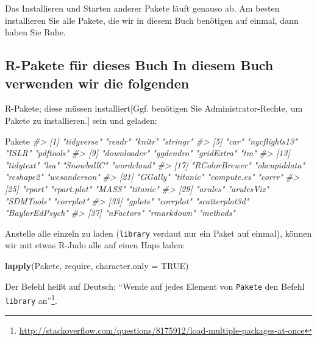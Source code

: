 \documentclass[12pt,]{book}
\newenvironment{Shaded}{\begin{snugshade}}{\end{snugshade}}
\newcommand{\KeywordTok}[1]{\textcolor[rgb]{0.13,0.29,0.53}{\textbf{{#1}}}}
\newcommand{\DataTypeTok}[1]{\textcolor[rgb]{0.13,0.29,0.53}{{#1}}}
\newcommand{\CommentTok}[1]{\textcolor[rgb]{0.56,0.35,0.01}{\textit{{#1}}}}
\newcommand{\OtherTok}[1]{\textcolor[rgb]{0.56,0.35,0.01}{{#1}}}
\newcommand{\NormalTok}[1]{{#1}}
\let\rmarkdownfootnote\footnote%
\def\footnote{\protect\rmarkdownfootnote}
\begin{document}
Das Installieren und Starten anderer Pakete läuft genauso ab. Am besten
installieren Sie alle Pakete, die wir in diesem Buch benötigen auf
einmal, dann haben Sie Ruhe.

\subsection{R-Pakete für dieses Buch In diesem Buch verwenden wir die
folgenden}\label{r-pakete-fur-dieses-buch-in-diesem-buch-verwenden-wir-die-folgenden}

R-Pakete; diese müssen installiert{[}Ggf. benötigen Sie
Administrator-Rechte, um Pakete zu installieren.{]} sein und geladen:

\begin{Shaded}
\begin{Highlighting}[]
\NormalTok{Pakete }
\CommentTok{#>  [1] "tidyverse"     "readr"         "knitr"         "stringr"      }
\CommentTok{#>  [5] "car"           "nycflights13"  "ISLR"          "pdftools"     }
\CommentTok{#>  [9] "downloader"    "ggdendro"      "gridExtra"     "tm"           }
\CommentTok{#> [13] "tidytext"      "lsa"           "SnowballC"     "wordcloud"    }
\CommentTok{#> [17] "RColorBrewer"  "okcupiddata"   "reshape2"      "wesanderson"  }
\CommentTok{#> [21] "GGally"        "titanic"       "compute.es"    "corrr"        }
\CommentTok{#> [25] "rpart"         "rpart.plot"    "MASS"          "titanic"      }
\CommentTok{#> [29] "arules"        "arulesViz"     "SDMTools"      "corrplot"     }
\CommentTok{#> [33] "gplots"        "corrplot"      "scatterplot3d" "BaylorEdPsych"}
\CommentTok{#> [37] "nFactors"      "rmarkdown"     "methods"}
\end{Highlighting}
\end{Shaded}

Anstelle alle einzeln zu laden (\texttt{library} verdaut nur ein Paket
auf einmal), können wir mit etwas R-Judo alle auf einen Haps laden:

\begin{Shaded}
\begin{Highlighting}[]
\KeywordTok{lapply}\NormalTok{(Pakete, require, }\DataTypeTok{character.only =} \OtherTok{TRUE}\NormalTok{) }
\end{Highlighting}
\end{Shaded}

Der Befehl heißt auf Deutsch: ``Wende auf jedes Element von
\texttt{Pakete} den Befehl \texttt{library} an''\footnote{\url{http://stackoverflow.com/questions/8175912/load-multiple-packages-at-once}}.
\end{document}
